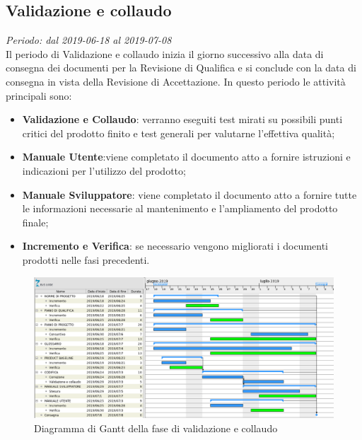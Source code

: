 \pagebreak


\subsection{Validazione e collaudo}
\textit{Periodo: dal 2019-06-18 al 2019-07-08 } \\
Il periodo di Validazione e collaudo inizia il giorno successivo alla data di consegna dei documenti per la 
Revisione di Qualifica e si conclude con la data di consegna in vista della Revisione di Accettazione. In questo periodo le attività principali sono:
\begin{itemize}
	\item \textbf{Validazione e Collaudo}: verranno eseguiti test mirati su possibili punti critici del prodotto finito e test generali per valutarne l'effettiva qualità;
	\item \textbf{Manuale Utente}:viene completato il documento atto a fornire istruzioni e indicazioni per l’utilizzo del prodotto;
	\item \textbf{Manuale Sviluppatore}: viene completato il documento atto a fornire tutte le informazioni necessarie al mantenimento e l’ampliamento del prodotto finale;
	\item \textbf{Incremento e Verifica}: se necessario vengono migliorati i 
	documenti prodotti nelle fasi precedenti.
\end{itemize}
\begin{figure}[H]
	\includegraphics[width=0.99\linewidth]{res/images/gantt_val.png}
	\caption{Diagramma di Gantt della fase di validazione e collaudo}
\end{figure}